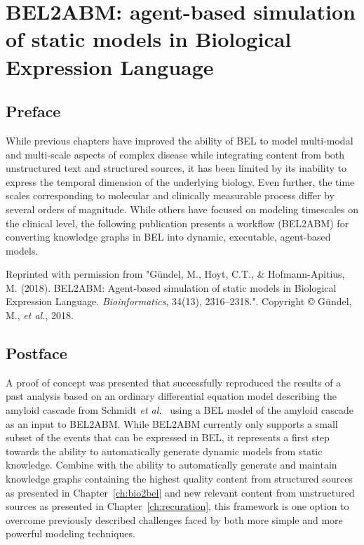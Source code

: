 \chapter{BEL2ABM: agent-based simulation of static models in Biological Expression Language}
\label{ch:bel2abm}

\section*{Preface}

While previous chapters have improved the ability of \ac{BEL} to model multi-modal and multi-scale aspects of complex disease while integrating content from both unstructured text and structured sources, it has been limited by its inability to express the temporal dimension of the underlying biology.
Even further, the time scales corresponding to molecular and clinically measurable process differ by several orders of magnitude.
While others have focused on modeling timescales on the clinical level, the following publication presents a workflow (BEL2ABM) for converting knowledge graphs in \ac{BEL} into dynamic, executable, agent-based models.

\vspace*{\fill}

Reprinted with permission from "Gündel, M., Hoyt, C.T., \& Hofmann-Apitius, M. (2018). BEL2ABM: Agent-based simulation of static models in Biological Expression Language. \textit{Bioinformatics}, 34(13), 2316–2318.".
Copyright © Gündel, M., \textit{et al.}, 2018.



\section*{Postface}

A proof of concept was presented that successfully reproduced the results of a past analysis based on an ordinary differential equation model describing the amyloid cascade from Schmidt \textit{et al.}~\cite{Schmidt2012} using a \ac{BEL} model of the amyloid cascade as an input to BEL2ABM\@.
While BEL2ABM currently only supports a small subset of the events that can be expressed in \ac{BEL}, it represents a first step towards the ability to automatically generate dynamic models from static knowledge.
Combine with the ability to automatically generate and maintain knowledge graphs containing the highest quality content from structured sources as presented in Chapter~\ref{ch:bio2bel} and new relevant content from unstructured sources as presented in Chapter~\ref{ch:recuration}, this framework is one option to overcome previously described challenges faced by both more simple and more powerful modeling techniques.
